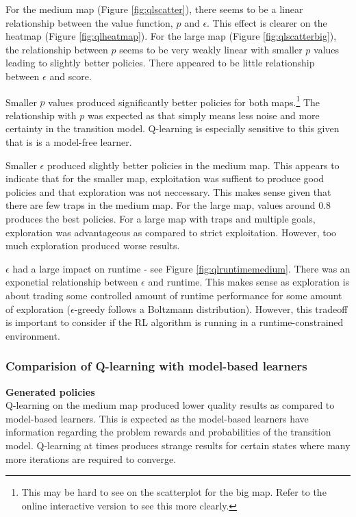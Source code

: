 \documentclass[11pt]{article}
\begin{document}




For the medium map (Figure \ref{fig:qlscatter}), there seems to be a linear relationship between the value function, $p$ and $\epsilon$. This effect is clearer on the heatmap (Figure \ref{fig:qlheatmap}). For the large map (Figure \ref{fig:qlscatterbig}), the relationship between $p$ seems to be very weakly linear with smaller $p$ values leading to slightly better policies. There appeared to be little relationship between $\epsilon$ and score.

Smaller $p$ values produced significantly better policies for both maps.\footnote{This may be hard to see on the scatterplot for the big map. Refer to the online interactive version to see this more clearly.} The relationship with $p$ was expected as that simply means less noise and more certainty in the transition model. Q-learning is especially sensitive to this given that is is a model-free learner.

Smaller $\epsilon$ produced slightly better policies in the medium map. This appears to indicate that for the smaller map, exploitation was suffient to produce good policies and that exploration was not neccessary. This makes sense given that there are few traps in the medium map. For the large map, values around 0.8 produces the best policies. For a large map with traps and multiple goals, exploration was advantageous as compared to strict exploitation. However, too much exploration produced worse results.

$\epsilon$ had a large impact on runtime - see Figure \ref{fig:qlruntimemedium}. There was an exponetial relationship between $\epsilon$ and runtime. This makes sense as exploration is about trading some controlled amount of runtime performance for some amount of exploration ($\epsilon$-greedy follows a Boltzmann distribution). However, this tradeoff is important to consider if the RL algorithm is running in a runtime-constrained environment.

\subsubsection{Comparision of Q-learning with model-based learners}

\noindent\textbf{Generated policies}\\
Q-learning on the medium map produced lower quality results as compared to model-based learners. This is expected as the model-based learners have information regarding the problem rewards and probabilities of the transition model. Q-learning at times produces strange results for certain states where many more iterations are required to converge.\\
\end{document}
